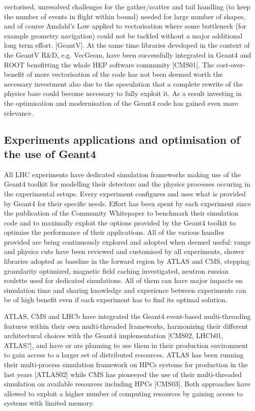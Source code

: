 \documentclass[10pt,a4paper]{article}
\begin{document}
vectorised, unresolved challenges for the gather/scatter and tail
handling (to keep the number of events in flight within bound) needed
for large number of shapes, and of course Amdahl's Law applied to
vectorisation where some bottleneck (for example geometry navigation)
could not be tackled without a major additional long term effort.
{[}GeantV{]}. At the same time libraries developed in the context of the
GeantV R\&D, e.g. VecGeom, have been successfully integrated in Geant4
and ROOT benefitting the whole HEP software community {[}CMS01{]}. The
cost-over-benefit of more vectorisation of the code has not been deemed
worth the necessary investment also due to the speculation that a
complete rewrite of the physics base could become necessary to fully
exploit it. As a result investing in the optimisation and modernisation
of the Geant4 code has gained even more relevance.

\hypertarget{experiments-applications-and-optimisation-of-the-use-of-geant4}{%
\subsection{Experiments applications and optimisation of the use of
Geant4}\label{experiments-applications-and-optimisation-of-the-use-of-geant4}}

All LHC experiments have dedicated simulation frameworks making use of
the Geant4 toolkit for modelling their detectors and the physics
processes occuring in the experimental setups. Every experiment
configures and uses what is provided by Geant4 for their specific needs.
Effort has been spent by each experiment since the publication of the
Community Whitepaper to benchmark their simulation code and to maximally
exploit the options provided by the Geant4 toolkit to optimise the
performance of their applications. All of the various handles provided
are being continuously explored and adopted when deemed useful: range
and physics cuts have been reviewed and customised by all experiments,
shower libraries adopted as baseline in the forward region by ATLAS and
CMS, stepping granularity optimized, magnetic field caching
investigated, neutron russian roulette used for dedicated simulations.
All of them can have major impacts on simulation time and sharing
knowledge and experience between experiments can be of high benefit even
if each experiment has to find its optimal solution.

ATLAS, CMS and LHCb have integrated the Geant4 event-based
multi-threading features within their own multi-threaded frameworks,
harmonizing their different architectural choices with the Geant4
implementation {[}CMS02, LHCb01, ATLAS?{]}, and have or are planning to
use them in their production environment to gain access to a larger set
of distributed resources. ATLAS has been running their multi-process
simulation framework on HPCs systems for production in the last years
{[}ATLAS02{]} while CMS has pioneered the use of their multi-threaded
simulation on available resources including HPCs {[}CMS03{]}. Both
approaches have allowed to exploit a higher number of computing
resources by gaining access to systems with limited memory.
\end{document}
